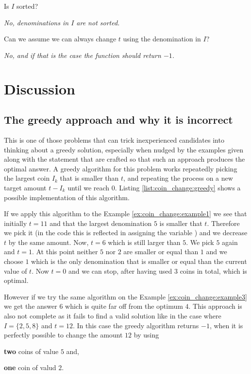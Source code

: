 \begin{QandA}
	\item Is $I$ sorted?
	\begin{answered}
		\textit{No, denominations in $I$ are not sorted.}
	\end{answered}

	\item Can we assume we can always change $t$ using the denomination in $I$?
	\begin{answered}
		\textit{No, and if that is the case the function should return $-1$.}
	\end{answered}
	
\end{QandA}

\section{Discussion}
\label{coin_change:sec:discussion}

\subsection{The greedy approach and why it is incorrect}
This is one of those problems that can trick inexperienced candidates into thinking about a greedy solution, especially when nudged by the examples given along with the statement that are crafted so that such an approach produces the optimal answer.
A greedy algorithm for this problem works repeatedly picking the largest coin $I_k$ that is smaller than $t$, and repeating the process on a new target amount $t-I_k$ until we reach $0$.
Listing \ref{list:coin_change:greedy} shows a possible implementation of this algorithm.

If we apply this algorithm to the Example \ref{ex:coin_change:example1}  we see that initially $t=11$
and that the largest denomination $5$ is smaller that $t$. Therefore we pick it (in the code this is reflected in assigning the variable ) and we decrease $t$ by the same amount.
Now, $t=6$ which is still larger than $5$. We pick $5$ again and $t = 1$.
At this point neither $5$ nor $2$ are smaller or equal than $1$ and we choose $1$ which is the only denomination that is smaller or equal than the current value of $t$.
Now $t=0$ and we can stop, after having used $3$ coins in total, which is optimal.

However if we try the same algorithm on the Example \ref{ex:coin_change:example3} we get the answer $6$ which is quite far off from the optimum $4$. 
This approach is also not complete as it fails to find a valid solution like in the case where $I=\{2,5,8\}$ and $t=12$. In this case the greedy algorithm returns $-1$, when it is perfectly possible to change the amount $12$ by using 
\begin{itemize*}
	\item \textbf{two} coins of value $5$ and,
	\item \textbf{one} coin of valud $2$.
\end{itemize*}	

